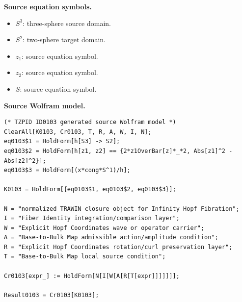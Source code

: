 \begin{minipage}[t]{0.49\linewidth}
\begingroup
\small
\raggedright
\textbf{Source equation symbols.}\par
\begin{itemize}[leftmargin=1.35em,itemsep=1pt,topsep=1pt,parsep=0pt]
    \item $S^3$: three-sphere source domain.
    \item $S^2$: two-sphere target domain.
    \item $z_1$: source equation symbol.
    \item $z_2$: source equation symbol.
    \item $S$: source equation symbol.
\end{itemize}
\endgroup
\end{minipage}\hfill
\begin{minipage}[t]{0.47\linewidth}
\begingroup
\scriptsize
\raggedright
\textbf{Source Wolfram model.}\par
\begin{Verbatim}[fontsize=\tiny,breaklines=true,breakanywhere=true]
(* TZPID ID0103 generated source Wolfram model *)
ClearAll[K0103, Cr0103, T, R, A, W, I, N];
eq0103$1 = HoldForm[h[S3] -> S2];
eq0103$2 = HoldForm[h[z1, z2] == {2*z1OverBar[z]*_*2, Abs[z1]^2 - Abs[z2]^2}];
eq0103$3 = HoldForm[(x*cong*S^1)/h];

K0103 = HoldForm[{eq0103$1, eq0103$2, eq0103$3}];

N = "normalized TRAWIN closure object for Infinity Hopf Fibration";
I = "Fiber Identity integration/comparison layer";
W = "Explicit Hopf Coordinates wave or operator carrier";
A = "Base-to-Bulk Map admissible action/amplitude condition";
R = "Explicit Hopf Coordinates rotation/curl preservation layer";
T = "Base-to-Bulk Map local source condition";

Cr0103[expr_] := HoldForm[N[I[W[A[R[T[expr]]]]]]];

Result0103 = Cr0103[K0103];
\end{Verbatim}
\endgroup
\end{minipage}

